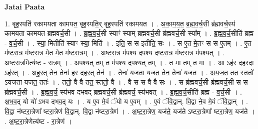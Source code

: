\documentclass[17pt]{extarticle}
\begin{document}
\textbf{Jatai Paata} \newline

1. बृह॒स्पति॑ रकामयता कामयत॒ बृह॒स्पति॒र् बृह॒स्पति॑ रकामयत । . अ॒का॒म॒य॒त॒ ब्र॒ह्म॒व॒र्च॒सी ब्र॑ह्मवर्च॒स्य॑ कामयता कामयत ब्रह्मवर्च॒सी । . ब्र॒ह्म॒व॒र्च॒सी स्याꣳ॑ स्याम् ब्रह्मवर्च॒सी ब्र॑ह्मवर्च॒सी स्या᳚म् । . ब्र॒ह्म॒व॒र्च॒सीति॑ ब्रह्म - व॒र्च॒सी । . स्या॒ मितीति॑ स्याꣳ स्या॒ मिति॑ । . इति॒ स स इतीति॒ सः । . स ए॒त मे॒तꣳ स स ए॒तम् । . ए॒त म॑ष्टरा॒त्र म॑ष्टरा॒त्र मे॒त मे॒त म॑ष्टरा॒त्रम् । . अ॒ष्ट॒रा॒त्र म॑पश्य दपश्य दष्टरा॒त्र म॑ष्टरा॒त्र म॑पश्यत् । . अ॒ष्ट॒रा॒त्रमित्य॑ष्ट - रा॒त्रम् । . अ॒प॒श्य॒त् तम् त म॑पश्य दपश्य॒त् तम् । . त मा तम् त मा । . आ ऽह॑र दहर॒दा ऽह॑रत् । . अ॒ह॒र॒त् तेन॒ तेना॑ हर दहर॒त् तेन॑ । . तेना॑ यजता यजत॒ तेन॒ तेना॑ यजत । . अ॒य॒ज॒त॒ तत॒ स्ततो॑ ऽयजता यजत॒ ततः॑ । . ततो॒ वै वै तत॒ स्ततो॒ वै । . वै स स वै वै सः । . स ब्र॑ह्मवर्च॒सी ब्र॑ह्मवर्च॒सी स स ब्र॑ह्मवर्च॒सी । . ब्र॒ह्म॒व॒र्च॒ स्य॑भव दभवद् ब्रह्मवर्च॒सी ब्र॑ह्मवर्च॒ स्य॑भवत् । . ब्र॒ह्म॒व॒र्च॒सीति॑ ब्रह्म - व॒र्च॒सी । . अ॒भ॒व॒द् यो यो॑ ऽभव दभव॒द् यः । . य ए॒व मे॒वं ॅयो य ए॒वम् । . ए॒वं ॅवि॒द्वान्. वि॒द्वा ने॒व मे॒वं ॅवि॒द्वान् । . वि॒द्वा न॑ष्टरा॒त्रेणा᳚ ष्टरा॒त्रेण॑ वि॒द्वान्. वि॒द्वा न॑ष्टरा॒त्रेण॑ । . अ॒ष्ट॒रा॒त्रेण॒ यज॑ते॒ यज॑ते ऽष्टरा॒त्रेणा᳚ ष्टरा॒त्रेण॒ यज॑ते । . अ॒ष्ट॒रा॒त्रेणेत्य॑ष्ट - रा॒त्रेण॑ । \newline
\end{document}
